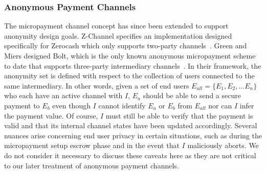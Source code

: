 \subsubsection{Anonymous Payment Channels} The micropayment channel concept has since
been extended to support anonymity design goals. Z-Channel specifies an
implementation designed specifically for Zerocash which only supports two-party
channels~\cite{zhang2017z}. Green and Miers designed Bolt, which is the only
known anonymous micropayment scheme to date that supports three-party
intermediary channels~\cite{green2017bolt}. In their framework, the anonymity
set is defined with respect to the collection of users connected to the same
intermediary. In other words, given a set of end users
$E_{all} = \{E_1, E_2, ... E_n\}$ who each have an active channel with $I$,
$E_a$ should be able to send a secure payment to $E_b$ even though $I$ cannot
identify $E_a$ or $E_b$ from $E_{all}$ nor can $I$ infer the payment value. Of
course, $I$ must still be able to verify that the payment is valid and that its
internal channel states have been updated accordingly.
Several nuances arise concerning end user privacy in certain
situations, such as during the micropayment setup escrow phase and in the event
that $I$ maliciously aborts. We do not consider it necessary to discuss these
caveats here as they are not critical to our later treatment of anonymous
payment channels.
